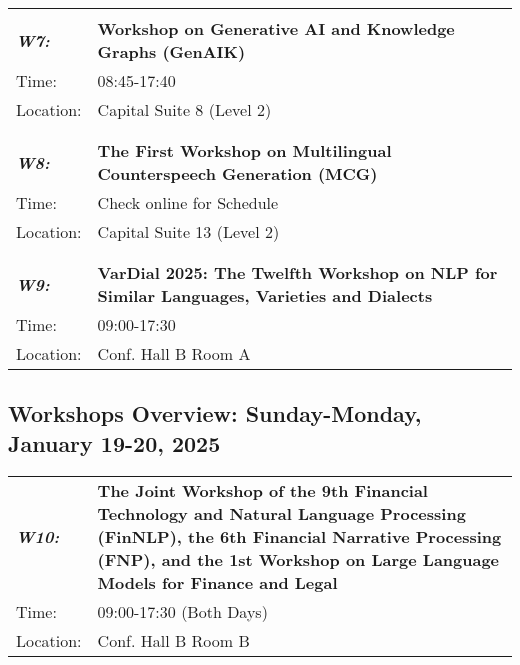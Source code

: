 \begin{longtable}{p{15mm}p{100mm}}
\hline\\
\emph{\textbf{W7:}} & \textbf{Workshop on Generative AI and Knowledge Graphs (GenAIK)} \\
Time: & 08:45-17:40 \\
Location: & Capital Suite 8 (Level 2) \\\\
\hline\\
\emph{\textbf{W8:}} & \textbf{The First Workshop on Multilingual Counterspeech Generation (MCG)} \\
Time: & Check online for Schedule \\
Location: & Capital Suite 13 (Level 2) \\\\
\hline\\
\emph{\textbf{W9:}} & \textbf{VarDial 2025: The Twelfth Workshop on NLP for Similar Languages, Varieties and Dialects} \\
Time: & 09:00-17:30 \\
Location: & Conf. Hall B Room A \\
\end{longtable}

\subsection{Workshops Overview: Sunday-Monday, January 19-20, 2025}
\begin{longtable}{p{15mm}p{100mm}}
\emph{\textbf{W10:}} & \textbf{The Joint Workshop of the 9th Financial Technology and Natural Language Processing (FinNLP), the 6th Financial Narrative Processing (FNP), and the 1st Workshop on Large Language Models for Finance and Legal} \\
Time: & 09:00-17:30 (Both Days) \\
Location: & Conf. Hall B Room B \\
\end{longtable}

